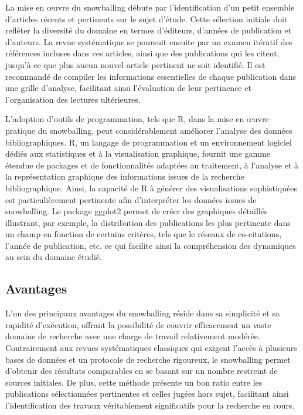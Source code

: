 \documentclass[
  letterpaper,
]{scrbook}
\begin{document}
La mise en œuvre du snowballing débute par l'identification d'un petit
ensemble d'articles récents et pertinents sur le sujet d'étude. Cette
sélection initiale doit refléter la diversité du domaine en termes
d'éditeurs, d'années de publication et d'auteurs. La revue systématique
se poursuit ensuite par un examen itératif des références incluses dans
ces articles, ainsi que des publications qui les citent, jusqu'à ce que
plus aucun nouvel article pertinent ne soit identifié. Il est recommandé
de compiler les informations essentielles de chaque publication dans une
grille d'analyse, facilitant ainsi l'évaluation de leur pertinence et
l'organisation des lectures ultérieures.

L'adoption d'outils de programmation, tels que R, dans la mise en œuvre
pratique du snowballing, peut considérablement améliorer l'analyse des
données bibliographiques. R, un langage de programmation et un
environnement logiciel dédiés aux statistiques et à la visualisation
graphique, fournit une gamme étendue de packages et de fonctionnalités
adaptées au traitement, à l'analyse et à la représentation graphique des
informations issues de la recherche bibliographique. Ainsi, la capacité
de R à générer des visualisations sophistiquées est particulièrement
pertinente afin d'interpréter les données issues de snowballing. Le
package ggplot2 permet de créer des graphiques détaillés illustrant, par
exemple, la distribution des publications les plus pertinente dans un
champ en fonction de certains critères, tels que le réseaux de
co-citations, l'année de publication, etc. ce qui facilite ainsi la
compréhension des dynamiques au sein du domaine étudié.

\hypertarget{avantages-2}{%
\subsection{Avantages}\label{avantages-2}}

L'un des principaux avantages du snowballing réside dans sa simplicité
et sa rapidité d'exécution, offrant la possibilité de couvrir
efficacement un vaste domaine de recherche avec une charge de travail
relativement modérée. Contrairement aux revues systématiques classiques
qui exigent l'accès à plusieurs bases de données et un protocole de
recherche rigoureux, le snowballing permet d'obtenir des résultats
comparables en se basant sur un nombre restreint de sources initiales.
De plus, cette méthode présente un bon ratio entre les publications
sélectionnées pertinentes et celles jugées hors sujet, facilitant ainsi
l'identification des travaux véritablement significatifs pour la
recherche en cours.
\end{document}
